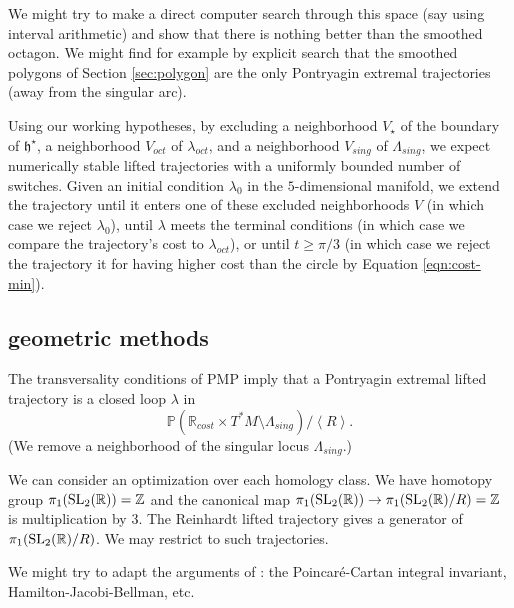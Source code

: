 \documentclass{article}
\theoremstyle{remark}
\newcommand{\ring}[1]{\mathbb{#1}}
\newcommand{\op}[1]{\hbox{#1}}
\newcommand{\ang}[1]{\left\langle{#1}\right\rangle}
\def\SL{\op{SL}_2(\ring{R})}
\def\hstar{{\mathfrak h}^\star}
\newcommand\Lsing{\Lambda_{sing}}
\begin{document}

We might try to make a direct computer search through this space (say
using interval arithmetic) and show that there is nothing better than
the smoothed octagon.  We might find for example by explicit search
that the smoothed polygons of Section \ref{sec:polygon} are the only
Pontryagin extremal trajectories (away from the singular arc).

Using our working hypotheses, by excluding a neighborhood $V_\star$ of the
boundary of $\hstar$, a neighborhood $V_{oct}$ of $\lambda_{oct}$, and a
neighborhood $V_{sing}$ of $\Lsing$, we expect numerically stable lifted trajectories
with a uniformly bounded number of switches.  Given an initial
condition $\lambda_0$ in the $5$-dimensional manifold, we extend the
trajectory until it enters one of these excluded neighborhoods $V$ (in
which case we reject $\lambda_0$), until $\lambda$ meets the terminal
conditions (in which case we compare the trajectory's cost to
$\lambda_{oct}$), or until $t\ge \pi/3$ (in which case we reject the
trajectory it for having higher cost than the circle by Equation \ref{eqn:cost-min}).

\subsection{geometric methods}

The transversality conditions of PMP imply that a Pontryagin extremal
lifted trajectory is a closed loop $\lambda$ in 
\[
\ring{P}(\ring{R}_{cost} \times T^*M \setminus \Lsing)/\ang{R}.
\]
  (We remove a neighborhood of the singular locus $\Lsing$.)

We can consider an optimization over each homology class.
We have homotopy group $\pi_1(\SL)=\ring{Z}$ and the canonical map
$\pi_1(\SL)\to \pi_1(\SL/R)=\ring{Z}$ is multiplication by $3$.  The
Reinhardt lifted trajectory gives a generator of $\pi_1(\SL/R)$.  We
may restrict to such trajectories.

We might try to adapt the arguments of \cite[Chapter
17]{agrachev2013control}: the Poincar\'e-Cartan integral invariant,
Hamilton-Jacobi-Bellman, etc.


 

\end{document}
